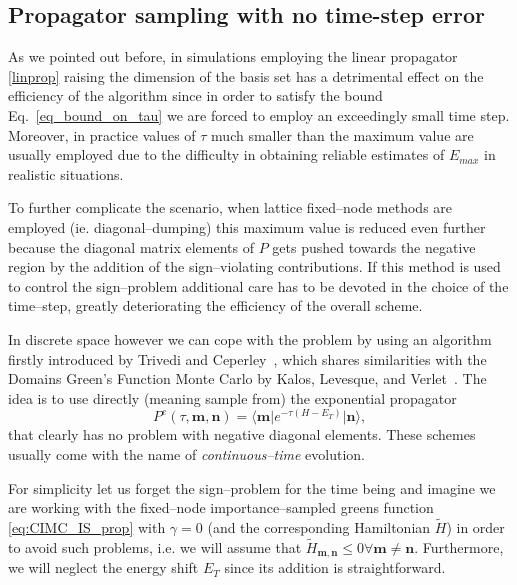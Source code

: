 \subsection{Propagator sampling with no time-step error}
As we pointed out before, in simulations employing the linear propagator \eqref{linprop} raising the dimension of the basis set has a detrimental effect on the efficiency 
of the algorithm since in order to satisfy the bound Eq.~\eqref{eq_bound_on_tau} we are forced to employ
an exceedingly small time step. Moreover, in practice values of $\tau$ much smaller than the
maximum value are usually employed due to the difficulty in obtaining reliable estimates of $E_{max}$ in realistic situations.

To further complicate the scenario, when lattice fixed--node methods are employed (ie. diagonal--dumping) this maximum value is reduced even further because the diagonal
matrix elements of $P$ gets pushed towards the negative region by the addition of the sign--violating contributions. If this method is used to control the sign--problem
additional care has to be devoted in the choice of the time--step, greatly deteriorating the efficiency of the overall scheme.

In discrete space however we can cope with the problem by using an algorithm firstly introduced by Trivedi and Ceperley~\cite{10}, which shares 
similarities with the Domains Green's Function Monte Carlo by Kalos, Levesque, and Verlet~\cite{11}. The idea is to use directly (meaning sample from) the exponential propagator
\begin{equation}
\label{exp_prop}
P^e(\tau,\mathbf{m},\mathbf{n}) = \langle \mathbf{m} \lvert e^{-\tau(H - E_T)} \rvert \mathbf{n}  \rangle,
\end{equation}
that clearly has no problem with negative diagonal elements. These schemes usually come with the name of  {\it continuous--time} evolution.

For simplicity let us forget the sign--problem for the time being and imagine we are working with the fixed--node importance--sampled greens function \eqref{eq:CIMC_IS_prop} 
with $\gamma=0$ (and the corresponding Hamiltonian $\tilde{H}$) in order to avoid such problems, i.e. we will assume that $\tilde{H}_{\mathbf{m},\mathbf{n}} \leq 0 \forall \mathbf{m}\neq \mathbf{n}$. 
Furthermore, we will neglect the energy shift $E_T$ since its addition is straightforward.


